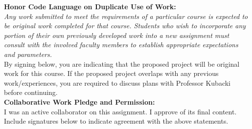 \documentclass[11pt]{article}
\begin{document}
	\begin{framed}
		\noindent \textbf{Honor Code Language on Duplicate Use of Work:}\\  \textit{Any work submitted to meet the requirements of a particular course is expected to be original work completed for that course. Students who wish to incorporate any portion of their own previously developed work into a new assignment must consult with the involved faculty members to establish appropriate expectations and parameters.} \\
		
		By signing below, you are indicating that the proposed project will be original work for this course.  If the proposed project overlaps with any previous work/experiences, you are required to discuss plans with Professor Kubacki before continuing.\\
		
		\noindent \textbf{Collaborative Work Pledge and Permission:}\\ I was an active collaborator on this assignment.  I approve of its final content.\\
		
		Include signatures below to indicate agreement with the above statements.
		\vspace{1.5in}
		\vspace{1.5in}
	\end{framed}
	\nocite{*}
	
\end{document}
